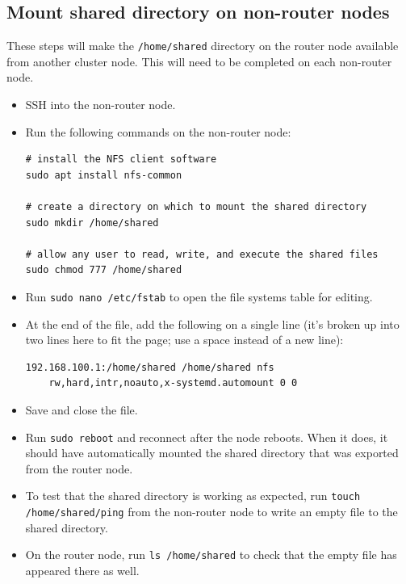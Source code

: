 \documentclass{article}
\begin{document}
\subsection{Mount shared directory on non-router nodes}

These steps will make the \texttt{/home/shared} directory on the router node available from another cluster node. This will need to be completed on each non-router node.

\begin{itemize}
    \item SSH into the non-router node.
    
    \item Run the following commands on the non-router node:
\begin{verbatim}
# install the NFS client software
sudo apt install nfs-common

# create a directory on which to mount the shared directory
sudo mkdir /home/shared

# allow any user to read, write, and execute the shared files
sudo chmod 777 /home/shared
\end{verbatim}
    
    \item Run \texttt{sudo nano /etc/fstab} to open the file systems table for editing.
    
    \item At the end of the file, add the following on a single line (it's broken up into two lines here to fit the page; use a space instead of a new line):
\begin{verbatim}
192.168.100.1:/home/shared /home/shared nfs 
    rw,hard,intr,noauto,x-systemd.automount 0 0
\end{verbatim}    

    \item Save and close the file.
    
    \item Run \texttt{sudo reboot} and reconnect after the node reboots. When it does, it should have automatically mounted the shared directory that was exported from the router node.
    
    \item To test that the shared directory is working as expected, run \texttt{touch /home/shared/ping} from the non-router node to write an empty file to the shared directory. 
    
    \item On the router node, run \texttt{ls /home/shared} to check that the empty file has appeared there as well. 
\end{itemize}
\end{document}
